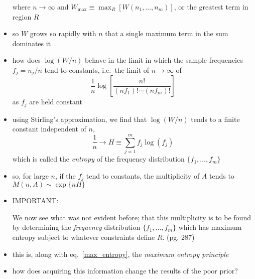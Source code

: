 \documentclass[../jaynes_prob_theory_notes.tex]{subfiles}
\begin{document}
\begin{itemize}
\begin{equation*}
                            \end{equation*}
                            where $n \rightarrow \infty$ and $W_{\max} \equiv \max_{R} \left[W(n_1, \ldots, n_m) \right]$, or the greatest term in region $R$
                        \item so $W$ grows so rapidly with $n$ that a single maximum term in the sum dominates it
                        \item how does $\log (W/n)$ behave in the limit in which the sample frequencies $f_j = n_j / n$ tend to constants, i.e.\ the limit of $n \rightarrow \infty$ of 
                            \begin{equation*}
                                \frac{1}{n} \log \left[ \frac{n!}{(nf_1)! \cdots (nf_m)!} \right]
                            \end{equation*}
                            as $f_j$ are held constant
                        \item using Stirling's approximation, we find that $\log (W/n)$ tends to a finite constant independent of $n$,
                            \begin{equation}
                                \label{max_entropy}
                                \frac{1}{n} \rightarrow H \equiv \sum\limits^{m}_{j=1} f_j \log (f_j)
                            \end{equation}
                            which is called the \textit{entropy} of the frequency distribution $\{ f_1, \ldots, f_m \}$
                        \item so, for large $n$, if the $f_j$ tend to constants, the multiplicity of $A$ tends to $M(n,A) \sim \exp \{nH\}$
                        \item IMPORTANT:\
                            \begin{displayquote}
                                We now see what was not evident before; that this multiplicity is to be found by determining the \textit{frequency} distribution $\{f_1, \ldots, f_m \}$ which has maximum entropy subject to whatever constraints define $R$. (pg. 287)
                            \end{displayquote}
                        \item this is, along with eq.~\ref{max_entropy}, the \textit{maximum entropy principle}
                        \item how does acquiring this information change the results of the poor prior?
                            \begin{itemize}

\end{itemize}
\end{itemize}
\end{document}

